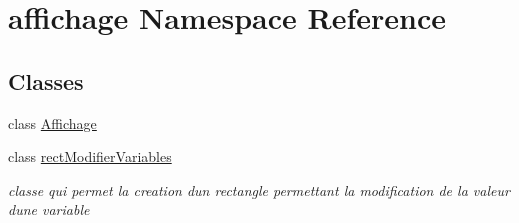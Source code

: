 \hypertarget{namespaceaffichage}{}\section{affichage Namespace Reference}
\label{namespaceaffichage}
\subsection*{Classes}
\begin{DoxyCompactItemize}
\item 
class \hyperlink{classaffichage_1_1_affichage}{Affichage}
\item 
class \hyperlink{classaffichage_1_1rect_modifier_variables}{rect\+Modifier\+Variables}
\begin{DoxyCompactList}\small\item\em classe qui permet la creation d\textquotesingle{}un rectangle permettant la modification de la valeur d\textquotesingle{}une variable \end{DoxyCompactList}\end{DoxyCompactItemize}
